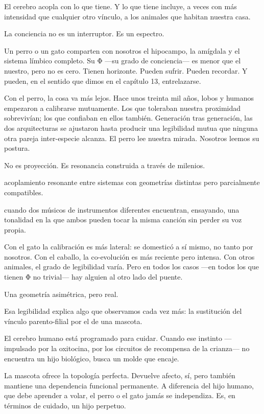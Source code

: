 El cerebro acopla con lo que tiene. Y lo que tiene incluye, a veces con más intensidad que cualquier otro vínculo, a los animales que habitan nuestra casa.

\noindent La conciencia no es un interruptor. Es un espectro.

Un perro o un gato comparten con nosotros el hipocampo, la amígdala y el sistema límbico completo. Su Φ —su grado de conciencia— es menor que el nuestro, pero no es cero. Tienen horizonte. Pueden sufrir. Pueden recordar. Y pueden, en el sentido que dimos en el capítulo 13, entrelazarse.

Con el perro, la cosa va más lejos. Hace unos treinta mil años, lobos y humanos empezaron a calibrarse mutuamente. Los que toleraban nuestra proximidad sobrevivían; los que confiaban en ellos también. Generación tras generación, las dos arquitecturas se ajustaron hasta producir una legibilidad mutua que ninguna otra pareja inter-especie alcanza. El perro lee nuestra mirada. Nosotros leemos su postura.

No es proyección. Es resonancia construida a través de milenios.

\begin{fisica}
 acoplamiento resonante entre sistemas con geometrías distintas pero parcialmente compatibles.

 cuando dos músicos de instrumentos diferentes encuentran, ensayando, una tonalidad en la que ambos pueden tocar la misma canción sin perder su voz propia.
\end{fisica}
Con el gato la calibración es más lateral: se domesticó a sí mismo, no tanto por nosotros. Con el caballo, la co-evolución es más reciente pero intensa. Con otros animales, el grado de legibilidad varía. Pero en todos los casos —en todos los que tienen Φ no trivial— hay alguien al otro lado del puente.

Una geometría asimétrica, pero real.

\noindent Esa legibilidad explica algo que observamos cada vez más: la sustitución del vínculo parento-filial por el de una mascota.

El cerebro humano está programado para cuidar. Cuando ese instinto —impulsado por la oxitocina, por los circuitos de recompensa de la crianza— no encuentra un hijo biológico, busca un molde que encaje.

La mascota ofrece la topología perfecta. Devuelve afecto, sí, pero también mantiene una dependencia funcional permanente. A diferencia del hijo humano, que debe aprender a volar, el perro o el gato jamás se independiza. Es, en términos de cuidado, un hijo perpetuo.

